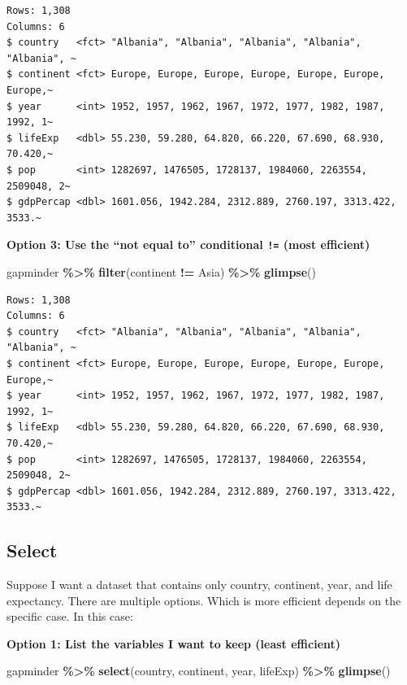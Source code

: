 \documentclass[
]{book}
\makeatletter
\newenvironment{Shaded}{\begin{snugshade}}{\end{snugshade}}
\newcommand{\FunctionTok}[1]{\textcolor[rgb]{0.27,0.27,0.27}{\textbf{#1}}}
\newcommand{\NormalTok}[1]{#1}
\newcommand{\SpecialCharTok}[1]{\textcolor[rgb]{0.43,0.43,0.43}{\textbf{#1}}}
\newcommand{\StringTok}[1]{\textcolor[rgb]{0.5,0.5,0.5}{#1}}
\newenvironment{kframe}{%
\medskip{}
\setlength{\fboxsep}{.8em}
 \def\at@end@of@kframe{}%
 \ifinner\ifhmode%
  \def\at@end@of@kframe{\end{minipage}}%
  \begin{minipage}{\columnwidth}%
 \fi\fi%
 \def\FrameCommand##1{\hskip\@totalleftmargin \hskip-\fboxsep
 \colorbox{shadecolor}{##1}\hskip-\fboxsep
     \hskip-\linewidth \hskip-\@totalleftmargin \hskip\columnwidth}%
 \MakeFramed {\advance\hsize-\width
   \@totalleftmargin\z@ \linewidth\hsize
   \@setminipage}}%
 {\par\unskip\endMakeFramed%
 \at@end@of@kframe}
\renewenvironment{Shaded}{\begin{kframe}}{\end{kframe}}
\makeatother
\begin{document}
\begin{verbatim}
Rows: 1,308
Columns: 6
$ country   <fct> "Albania", "Albania", "Albania", "Albania", "Albania", ~
$ continent <fct> Europe, Europe, Europe, Europe, Europe, Europe, Europe,~
$ year      <int> 1952, 1957, 1962, 1967, 1972, 1977, 1982, 1987, 1992, 1~
$ lifeExp   <dbl> 55.230, 59.280, 64.820, 66.220, 67.690, 68.930, 70.420,~
$ pop       <int> 1282697, 1476505, 1728137, 1984060, 2263554, 2509048, 2~
$ gdpPercap <dbl> 1601.056, 1942.284, 2312.889, 2760.197, 3313.422, 3533.~
\end{verbatim}

\textbf{Option 3: Use the ``not equal to'' conditional \texttt{!=} (most efficient)}

\begin{Shaded}
\begin{Highlighting}[]
\NormalTok{gapminder }\SpecialCharTok{\%\textgreater{}\%} 
  \FunctionTok{filter}\NormalTok{(continent }\SpecialCharTok{!=} \StringTok{\textquotesingle{}Asia\textquotesingle{}}\NormalTok{) }\SpecialCharTok{\%\textgreater{}\%} 
  \FunctionTok{glimpse}\NormalTok{()}
\end{Highlighting}
\end{Shaded}

\begin{verbatim}
Rows: 1,308
Columns: 6
$ country   <fct> "Albania", "Albania", "Albania", "Albania", "Albania", ~
$ continent <fct> Europe, Europe, Europe, Europe, Europe, Europe, Europe,~
$ year      <int> 1952, 1957, 1962, 1967, 1972, 1977, 1982, 1987, 1992, 1~
$ lifeExp   <dbl> 55.230, 59.280, 64.820, 66.220, 67.690, 68.930, 70.420,~
$ pop       <int> 1282697, 1476505, 1728137, 1984060, 2263554, 2509048, 2~
$ gdpPercap <dbl> 1601.056, 1942.284, 2312.889, 2760.197, 3313.422, 3533.~
\end{verbatim}

\hypertarget{select}{%
\subsection{Select}\label{select}}

Suppose I want a dataset that contains only country, continent, year, and life expectancy. There are multiple options. Which is more efficient depends on the specific case. In this case:

\textbf{Option 1: List the variables I want to keep (least efficient)}

\begin{Shaded}
\begin{Highlighting}[]
\NormalTok{gapminder }\SpecialCharTok{\%\textgreater{}\%} 
  \FunctionTok{select}\NormalTok{(country, continent, year, lifeExp) }\SpecialCharTok{\%\textgreater{}\%} 
  \FunctionTok{glimpse}\NormalTok{()}
\end{Highlighting}
\end{Shaded}
\end{document}
